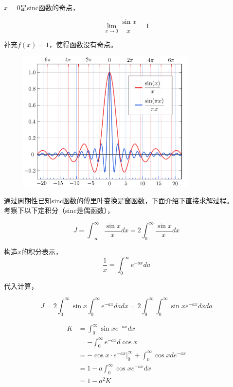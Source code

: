 		$x = 0$是sinc函数的奇点，

		$$
			\lim_{x\rightarrow 0} \frac{\sin x}{x} = 1
		$$

		补充$f(x) = 1$，使得函数没有奇点。\\

		\begin{figure}[H]
			\begin{center}
				\includegraphics[width=0.8\textwidth]{./images/sinc_graph.png}
			\end{center}
		\end{figure}

		通过周期性已知sinc函数的傅里叶变换是窗函数，下面介绍下直接求解过程。\\


		考察下以下定积分（sinc是偶函数），

		$$
			J = \int_{-\infty}^{\infty} \frac{\sin x}{x}dx = 2\int_{0}^{\infty} \frac{\sin x}{x}dx
		$$

		构造$x$的积分表示，
		$$
			\frac{1}{x} = \int_0^\infty e^{-ax}da
		$$

		代入计算，

		$$
			J = 2\int_{0}^{\infty} \sin x \int_0^\infty e^{-ax}da dx = 2\int_{0}^{\infty}\int_{0}^{\infty}\sin x e^{-ax} dx da
		$$

		\begin{align*}
			K &= \int_{0}^{\infty}\sin x e^{-ax} dx\\
				&= -\int_{0}^{\infty}e^{-ax} d\cos x\\
				&= -\cos x \cdot e^{-ax}\Big|_0^{\infty} + \int_{0}^{\infty}\cos x de^{-ax}\\
				&= 1 - a \int_0^\infty \cos x e^{-ax} dx\\
				&= 1 - a^2K
		\end{align*}


